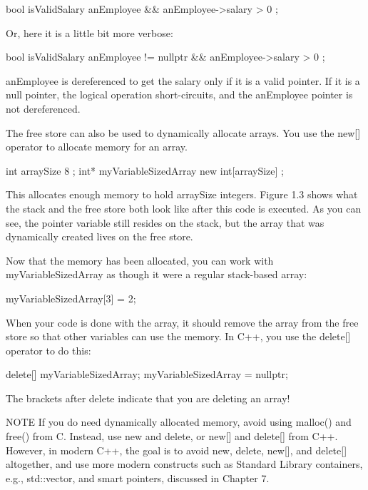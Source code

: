 \begin{cpp}
bool isValidSalary { anEmployee && anEmployee->salary > 0 };
\end{cpp}

Or, here it is a little bit more verbose:

\begin{cpp}
bool isValidSalary { anEmployee != nullptr && anEmployee->salary > 0 };
\end{cpp}

anEmployee is dereferenced to get the salary only if it is a valid pointer. If it is a null pointer, the logical operation short-circuits, and the anEmployee pointer is not dereferenced.


The free store can also be used to dynamically allocate arrays. You use the new[] operator to allocate memory for an array.

\begin{cpp}
int arraySize { 8 };
int* myVariableSizedArray { new int[arraySize] };
\end{cpp}

This allocates enough memory to hold arraySize integers. Figure 1.3 shows what the stack and the free store both look like after this code is executed. As you can see, the pointer variable still resides on the stack, but the array that was dynamically created lives on the free store.

Now that the memory has been allocated, you can work with myVariableSizedArray as though it were a regular stack-based array:

\begin{cpp}
myVariableSizedArray[3] = 2;
\end{cpp}

When your code is done with the array, it should remove the array from the free store so that other variables can use the memory. In C++, you use the delete[] operator to do this:

\begin{cpp}
delete[] myVariableSizedArray;
myVariableSizedArray = nullptr;
\end{cpp}

The brackets after delete indicate that you are deleting an array!


\begin{myNotic}{NOTE}
If you do need dynamically allocated memory, avoid using malloc() and free() from C. Instead, use new and delete, or new[] and delete[] from C++. However, in modern C++, the goal is to avoid new, delete, new[], and delete[] altogether, and use more modern constructs such as Standard Library containers, e.g., std::vector, and smart pointers, discussed in Chapter 7.
\end{myNotic}

